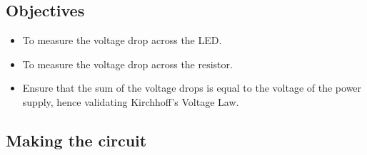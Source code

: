 \documentclass[a4paper, 10pt]{article}
\begin{document}
		\subsection{Objectives}
			\begin{itemize}
				\item To measure the voltage drop across the LED.
				\item To measure the voltage drop across the resistor.
				\item Ensure that the sum of the voltage drops is equal to the voltage of the power supply, hence validating Kirchhoff's Voltage Law.
			\end{itemize}

		\subsection{Making the circuit}
			
\end{document}
